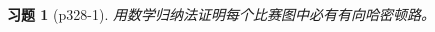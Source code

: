 \documentclass{article}
\begin{document}
\begin{CJK}{UTF8}{gbsn}
  \newtheorem*{Exercise}{习题}
  \huge
\begin{Exercise}[p328-1]
用数学归纳法证明每个比赛图中必有有向哈密顿路。
\end{Exercise}

\end{CJK}
\end{document}
